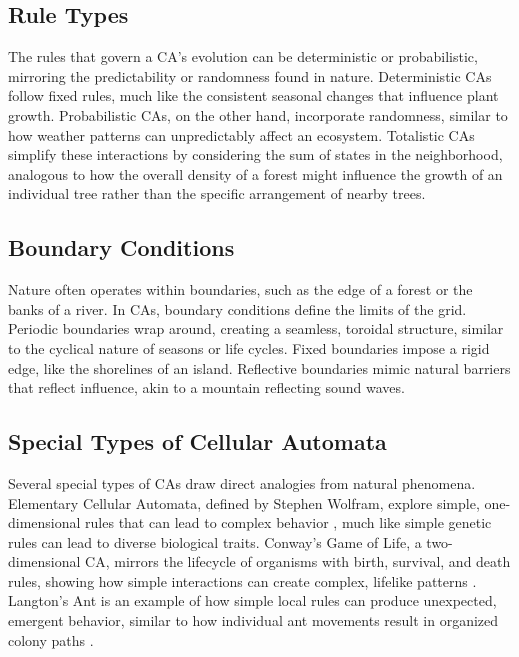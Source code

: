 \documentclass[9pt,a4paper,twoside]{tau-class/tau}
\begin{document}
\subsection{Rule Types}

The rules that govern a CA's evolution can be deterministic or probabilistic, mirroring the predictability or randomness found in nature. Deterministic CAs follow fixed rules, much like the consistent seasonal changes that influence plant growth. Probabilistic CAs, on the other hand, incorporate randomness, similar to how weather patterns can unpredictably affect an ecosystem. Totalistic CAs simplify these interactions by considering the sum of states in the neighborhood, analogous to how the overall density of a forest might influence the growth of an individual tree rather than the specific arrangement of nearby trees.

\subsection{Boundary Conditions}

Nature often operates within boundaries, such as the edge of a forest or the banks of a river. In CAs, boundary conditions define the limits of the grid. Periodic boundaries wrap around, creating a seamless, toroidal structure, similar to the cyclical nature of seasons or life cycles. Fixed boundaries impose a rigid edge, like the shorelines of an island. Reflective boundaries mimic natural barriers that reflect influence, akin to a mountain reflecting sound waves.

\subsection{Special Types of Cellular Automata}

Several special types of CAs draw direct analogies from natural phenomena. Elementary Cellular Automata, defined by Stephen Wolfram, explore simple, one-dimensional rules that can lead to complex behavior \cite{wolfram2002}, much like simple genetic rules can lead to diverse biological traits. Conway's Game of Life, a two-dimensional CA, mirrors the lifecycle of organisms with birth, survival, and death rules, showing how simple interactions can create complex, lifelike patterns \cite{gardner1970}. Langton's Ant is an example of how simple local rules can produce unexpected, emergent behavior, similar to how individual ant movements result in organized colony paths \cite{langton1986}.
\end{document}
